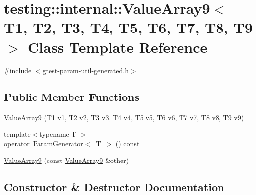 \hypertarget{classtesting_1_1internal_1_1ValueArray9}{}\section{testing\+::internal\+::Value\+Array9$<$ T1, T2, T3, T4, T5, T6, T7, T8, T9 $>$ Class Template Reference}
\label{classtesting_1_1internal_1_1ValueArray9}


{\ttfamily \#include $<$gtest-\/param-\/util-\/generated.\+h$>$}

\subsection*{Public Member Functions}
\begin{DoxyCompactItemize}
\item 
\mbox{\hyperlink{classtesting_1_1internal_1_1ValueArray9_a4985545b509dc5d7db659cd31b110c21}{Value\+Array9}} (T1 v1, T2 v2, T3 v3, T4 v4, T5 v5, T6 v6, T7 v7, T8 v8, T9 v9)
\item 
{\footnotesize template$<$typename T $>$ }\\\mbox{\hyperlink{classtesting_1_1internal_1_1ValueArray9_aede7e5849cfab0504c49673d5c5c4cce}{operator Param\+Generator$<$ T $>$}} () const
\item 
\mbox{\hyperlink{classtesting_1_1internal_1_1ValueArray9_ab251d9c7a0df5c8034ecda38eadd030a}{Value\+Array9}} (const \mbox{\hyperlink{classtesting_1_1internal_1_1ValueArray9}{Value\+Array9}} \&other)
\end{DoxyCompactItemize}


\subsection{Constructor \& Destructor Documentation}
\mbox{\label{classtesting_1_1internal_1_1ValueArray9_a4985545b509dc5d7db659cd31b110c21}} 

